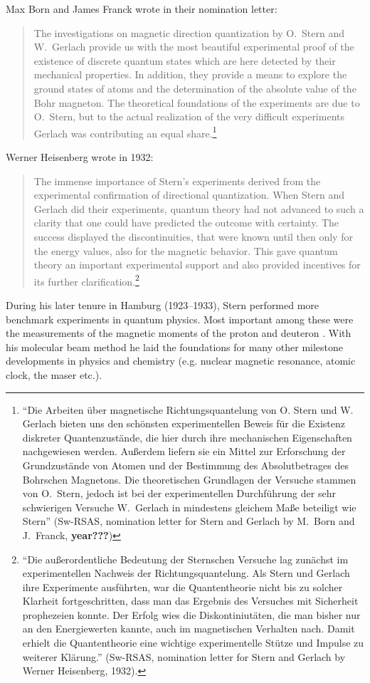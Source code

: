 \documentclass{article}
\begin{document}
Max Born and James Franck wrote in their nomination letter: 
\begin{quote}
The investigations on magnetic direction quantization by O.~Stern and W.~Gerlach provide us with the most beautiful experimental proof of the existence of discrete quantum states which are here detected by their mechanical properties. In addition, they provide a means to explore the ground states of atoms and the determination of the absolute value of the Bohr magneton. The theoretical foundations of the experiments are due to O.~Stern, but to the actual realization of the very difficult experiments Gerlach was contributing an equal share.\footnote{``Die Arbeiten über magnetische Richtungsquantelung von O. Stern und W. Gerlach bieten uns den schönsten experimentellen Beweis für die Existenz diskreter Quantenzustände, die hier durch ihre mechanischen Eigenschaften nachgewiesen werden. Außerdem liefern sie ein Mittel zur Erforschung der Grundzustände von Atomen und der Bestimmung des Absolutbetrages des Bohrschen Magnetons. Die theoretischen Grundlagen der Versuche stammen von O.~Stern, jedoch ist bei der experimentellen Durchführung der sehr schwierigen Versuche W.~Gerlach in mindestens gleichem Maße beteiligt wie Stern'' (Sw-RSAS, nomination letter for Stern and Gerlach by M.~Born and J.~Franck, {\bf year???})}
\end{quote}  
Werner Heisenberg wrote in 1932: 
\begin{quote}
The immense importance of Stern's experiments derived from the experimental confirmation of directional quantization. When Stern and Gerlach did their experiments, quantum theory had not advanced to such a clarity that one could have predicted the outcome with certainty. The success displayed the discontinuities, that were known until then only for the energy values, also for the magnetic behavior. This gave quantum theory an important experimental support and also provided incentives for its further clarification.\footnote{``Die außerordentliche Bedeutung der Sternschen Versuche lag zunächst im experimentellen Nachweis der Richtungsquantelung. Als Stern und Gerlach ihre Experimente ausführten, war die Quantentheorie nicht bis zu solcher Klarheit fortgeschritten, dass man das Ergebnis des Versuches mit Sicherheit prophezeien konnte. Der Erfolg wies die Diskontiniutäten, die man bisher nur an den Energiewerten kannte, auch im magnetischen Verhalten nach. Damit erhielt die Quantentheorie eine wichtige experimentelle Stütze und Impulse zu weiterer Klärung.''  (Sw-RSAS, nomination letter for Stern and Gerlach by Werner Heisenberg, 1932).}
\end{quote}
During his later tenure in Hamburg (1923--1933), Stern performed more benchmark experiments in quantum physics. Most important among these were the measurements of the magnetic moments of the proton and deuteron \citep{FrischOEtal1933Ablenkunga,FrischOEtal1933Ablenkung,EstermannIEtal1933Moment,EstermannIEtal1933Ablenkung,EstermannIEtal1933Ablenkung2}.  With his molecular beam method he laid the foundations for many other milestone developments in physics and chemistry (e.g. nuclear magnetic resonance, atomic clock, the maser etc.). 
\end{document}
